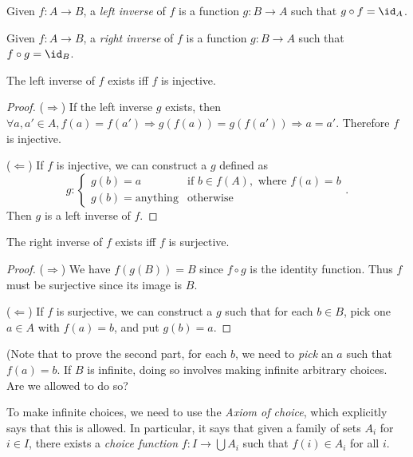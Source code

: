 \documentclass[a4paper]{article}
\begin{document}
\begin{defi}
  Given $f: A\to B$, a \emph{left inverse} of $f$ is a function $g:B\to A$ such that $g\circ f = \id _A$.
\end{defi}

\begin{defi}
  Given $f: A\to B$, a \emph{right inverse} of $f$ is a function $g:B\to A$ such that $f\circ g = \id _B$.
\end{defi}

\begin{thm}
  The left inverse of $f$ exists iff $f$ is injective.
\end{thm}

\begin{proof}
  ($\Rightarrow$)
  If the left inverse $g$ exists, then $\forall a, a'\in A, f(a) = f(a') \Rightarrow g( f(a))=g(f(a'))\Rightarrow a=a'$. Therefore $f$ is injective.

  ($\Leftarrow$) If $f$ is injective, we can construct a $g$ defined as
  \[
    g: \begin{cases}
      g(b) = a &\text{if }b\in f(A), \text{ where }f(a) = b\\
      g(b) = \text{anything} & \text{otherwise}
    \end{cases}.
  \]
  Then $g$ is a left inverse of $f$.
\end{proof}

\begin{thm}
  The right inverse of $f$ exists iff $f$ is surjective.
\end{thm}

\begin{proof}
  ($\Rightarrow$) We have $f(g(B)) = B$ since $f\circ g$ is the identity function. Thus $f$ must be surjective since its image is $B$.

  ($\Leftarrow$) If $f$ is surjective, we can construct a $g$ such that for each $b\in B$, pick one $a\in A$ with $f(a) = b$, and put $g(b) = a$.
\end{proof}

(Note that to prove the second part, for each $b$, we need to \emph{pick} an $a$ such that $f(a) = b$. If $B$ is infinite, doing so involves making infinite arbitrary choices. Are we allowed to do so?

To make infinite choices, we need to use the \emph{Axiom of choice}, which explicitly says that this is allowed. In particular, it says that given a family of sets $A_i$ for $i \in I$, there exists a \emph{choice function} $f: I \to \bigcup A_i$ such that $f(i)\in A_i$ for all $i$.
\end{document}
